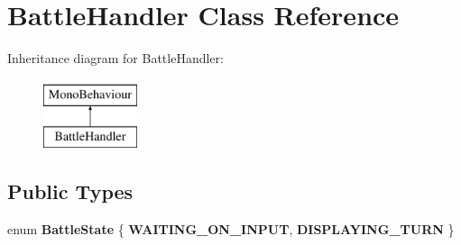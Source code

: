\hypertarget{class_battle_handler}{\section{Battle\-Handler Class Reference}
\label{class_battle_handler}
}
Inheritance diagram for Battle\-Handler\-:\begin{figure}[H]
\begin{center}
\leavevmode
\includegraphics[height=2.000000cm]{class_battle_handler}
\end{center}
\end{figure}
\subsection*{Public Types}
\begin{DoxyCompactItemize}
\item 
enum {\bfseries Battle\-State} \{ {\bfseries W\-A\-I\-T\-I\-N\-G\-\_\-\-O\-N\-\_\-\-I\-N\-P\-U\-T}, 
{\bfseries D\-I\-S\-P\-L\-A\-Y\-I\-N\-G\-\_\-\-T\-U\-R\-N}
 \}
\end{DoxyCompactItemize}
